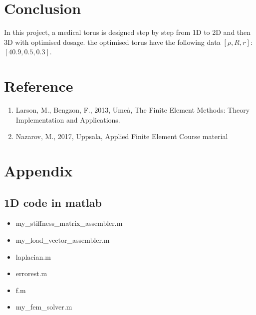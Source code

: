 \documentclass[12pt]{article}
\begin{document}
\section{Conclusion}
In this project, a medical torus is designed step by step from 1D to 2D and then 3D with optimised dosage. the optimised torus have the following data $[\rho, R, r]$: $[40.9, 0.5, 0.3]$.\\
\newpage


\section{Reference}

\begin{enumerate}
\item Larson, M., Bengzon, F., 2013, Ume\aa, The Finite Element Methods: Theory Implementation and Applications.
\item Nazarov, M., 2017, Uppsala,  Applied Finite Element Course material
\end{enumerate}


\section{Appendix}

\subsection{1D code in matlab}
\singlespacing
\begin{itemize}
\item {\large my{\_}stiffness{\_}matrix{\_}assembler.m}

\vspace{1cm}

\item {\large my{\_}load{\_}vector{\_}assembler.m}

\vspace{1cm}

\item {\large laplacian.m}

\vspace{1cm}

\item {\large errorest.m}

\vspace{1cm}

\item {\large f.m}

\vspace{1cm}

\item {\large my{\_}fem{\_}solver.m}

\vspace{1cm}
\end{itemize}
\end{document}
